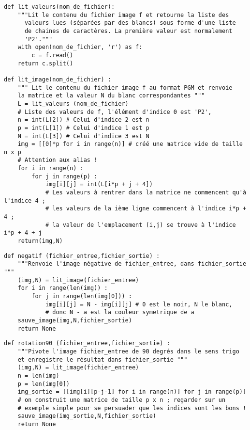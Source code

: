 \question{}

\begin{lstlisting}
def lit_valeurs(nom_de_fichier):
    """Lit le contenu du fichier image f et retourne la liste des
      valeurs lues (séparées par des blancs) sous forme d'une liste
      de chaines de caractères. La première valeur est normalement
      'P2'."""
    with open(nom_de_fichier, 'r') as f:
        c = f.read()
    return c.split()

def lit_image(nom_de_fichier) :
    """ Lit le contenu du fichier image f au format PGM et renvoie
    la matrice et la valeur N du blanc correspondantes """
    L = lit_valeurs (nom_de_fichier) 
    # Liste des valeurs de f, l'élément d'indice 0 est 'P2',
    n = int(L[2]) # Celui d'indice 2 est n
    p = int(L[1]) # Celui d'indice 1 est p
    N = int(L[3]) # Celui d'indice 3 est N
    img = [[0]*p for i in range(n)] # créé une matrice vide de taille n x p
    # Attention aux alias ! 
    for i in range(n) :
        for j in range(p) :
            img[i][j] = int(L[i*p + j + 4])
            # Les valeurs à rentrer dans la matrice ne commencent qu'à l'indice 4 ;
            # les valeurs de la ième ligne commencent à l'indice i*p + 4 ; 
            # la valeur de l'emplacement (i,j) se trouve à l'indice i*p + 4 + j
    return(img,N)
\end{lstlisting}

\question{}

\begin{lstlisting}
def negatif (fichier_entree,fichier_sortie) :
    """Renvoie l'image négative de fichier_entree, dans fichier_sortie """
    (img,N) = lit_image(fichier_entree)
    for i in range(len(img)) :
        for j in range(len(img[0])) :
            img[i][j] = N - img[i][j] # 0 est le noir, N le blanc,
            # donc N - a est la couleur symetrique de a
    sauve_image(img,N,fichier_sortie)
    return None
\end{lstlisting}

\question{}

\begin{lstlisting}
def rotation90 (fichier_entree,fichier_sortie) :
    """Pivote l'image fichier_entree de 90 degrés dans le sens trigo
    et enregistre le résultat dans fichier_sortie """
    (img,N) = lit_image(fichier_entree)
    n = len(img)
    p = len(img[0])
    img_sortie = [[img[i][p-j-1] for i in range(n)] for j in range(p)]
    # on construit une matrice de taille p x n ; regarder sur un
    # exemple simple pour se persuader que les indices sont les bons !
    sauve_image(img_sortie,N,fichier_sortie)
    return None
\end{lstlisting}
